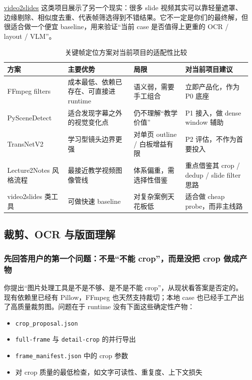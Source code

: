 \documentclass[a4paper]{article}
\begin{document}
\href{https://pypi.org/project/video2slides/}{video2slides} 这类项目展示了另一个现实：很多 slide 视频其实可以靠轻量遮罩、边缘剔除、相似度去重、代表帧筛选得到不错结果。它不一定是你们的最终解，但很适合做一个便宜 baseline，用来验证“当前 case 是否值得上更重的 OCR / layout / VLM”。

\begin{table}[H]
\centering
\caption{关键帧定位方案对当前项目的适配性比较}
\begin{tabularx}{\textwidth}{p{2.4cm}p{2.3cm}Yp{2.4cm}}
\toprule
方案 & 主要优势 & 局限 & 对当前项目建议 \\
\midrule
FFmpeg filters & 成本最低、依赖已存在、可直接进 runtime & 语义弱，需要手工组合 & 立即产品化，作为 P0 底座 \\
PySceneDetect & 适合发现字幕之外的视觉变化点 & 仍不理解“教学价值” & P1 接入，做 dense window 辅助 \\
TransNetV2 & 学习型镜头边界更强 & 对单页 outline / 白板增益有限 & P2 评估，不作为首要投入 \\
Lecture2Notes 风格流程 & 最接近教学视频图像管线 & 体系偏重，需选择性借鉴 & 重点借鉴其 crop / dedup / slide filter 思路 \\
video2slides 类工具 & 可做快速 baseline & 对复杂案例天花板低 & 适合做 cheap probe，而非主线路 \\
\bottomrule
\end{tabularx}
\end{table}

\subsection{裁剪、OCR 与版面理解}

\subsubsection{先回答用户的第一个问题：不是“不能 crop”，而是没把 crop 做成产物}

你提出“图片处理工具是不是不够、是不是不能 crop”，从现状看答案是否定的。现有依赖里已经有 Pillow，FFmpeg 也天然支持裁切；本地 case 也已经手工产出了高质量裁剪图。问题在于 runtime 没有下面这些确定性产物：

\begin{itemize}
\item \texttt{crop\_proposal.json}
\item \texttt{full-frame} 与 \texttt{detail-crop} 的并行导出
\item \texttt{frame\_manifest.json} 中的 crop 参数
\item 对 crop 质量的最低检查，如文字可读性、重复度、上下文损失
\end{itemize}
\end{document}
